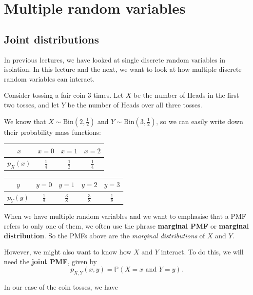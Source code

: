 \documentclass[
  a4paper,
]{book}
\theoremstyle{definition}
\theoremstyle{definition}
\theoremstyle{definition}
\theoremstyle{definition}
\theoremstyle{remark}
\begin{document}
\hypertarget{L13-multi-rv}{%
\chapter{Multiple random variables}\label{L13-multi-rv}}

\hypertarget{joint}{%
\section{Joint distributions}\label{joint}}

In previous lectures, we have looked at single discrete random variables in isolation. In this lecture and the next, we want to look at how multiple discrete random variables can interact.

Consider tossing a fair coin 3 times. Let \(X\) be the number of Heads in the first two tosses, and let \(Y\) be the number of Heads over all three tosses.

We know that \(X \sim \text{Bin}(2, \frac12)\) and \(Y \sim \text{Bin}(3, \frac12)\), so we can easily write down their probability mass functions:

\begin{longtable}[]{@{}cccc@{}}
\toprule()
\(x\) & \(x = 0\) & \(x = 1\) & \(x = 2\) \\
\midrule()
\endhead
\(p_X(x)\) & \(\frac14\) & \(\frac12\) & \(\frac14\) \\
\bottomrule()
\end{longtable}

\begin{longtable}[]{@{}ccccc@{}}
\toprule()
\(y\) & \(y = 0\) & \(y = 1\) & \(y = 2\) & \(y = 3\) \\
\midrule()
\endhead
\(p_Y(y)\) & \(\frac18\) & \(\frac38\) & \(\frac38\) & \(\frac18\) \\
\bottomrule()
\end{longtable}

When we have multiple random variables and we want to emphasise that a PMF refers to only one of them, we often use the phrase \textbf{marginal PMF} or \textbf{marginal distribution}. So the PMFs above are the \emph{marginal distributions} of \(X\) and \(Y\).

However, we might also want to know how \(X\) and \(Y\) interact. To do this, we will need the \textbf{joint PMF}, given by
\[ p_{X,Y}(x,y) = \mathbb P(X = x \text{ and } Y = y) . \]

In our case of the coin tosses, we have
\end{document}
